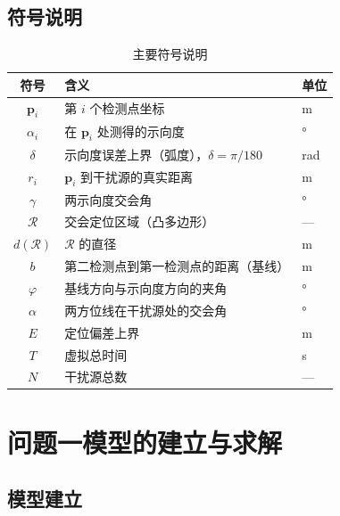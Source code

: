 \documentclass[12pt,a4paper]{ctexart}
\begin{document}
\subsection{符号说明}

\begin{table}[H]
\centering
\caption{主要符号说明}
\label{tab:symbols}
\begin{tabular}{cll}
\toprule
符号 & 含义 & 单位 \\
\midrule
$\bm{p}_i$ & 第 $i$ 个检测点坐标 & m \\
$\alpha_i$ & 在 $\bm{p}_i$ 处测得的示向度 & $°$ \\
$\delta$ & 示向度误差上界（弧度），$\delta=\pi/180$ & rad \\
$r_i$ & $\bm{p}_i$ 到干扰源的真实距离 & m \\
$\gamma$ & 两示向度交会角 & $°$ \\
$\mathcal{R}$ & 交会定位区域（凸多边形） & — \\
$d(\mathcal{R})$ & $\mathcal{R}$ 的直径 & m \\
$b$ & 第二检测点到第一检测点的距离（基线） & m \\
$\varphi$ & 基线方向与示向度方向的夹角 & $°$ \\
$\alpha$ & 两方位线在干扰源处的交会角 & $°$ \\
$E$ & 定位偏差上界 & m \\
$T$ & 虚拟总时间 & s \\
$N$ & 干扰源总数 & — \\
\bottomrule
\end{tabular}
\end{table}

\section{问题一模型的建立与求解}
\label{sec:q1}

\subsection{模型建立}
\end{document}
